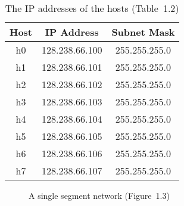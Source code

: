 \documentclass{../UTNetLab}
\begin{document}
\begin{minipage}{0.48\textwidth}
    \begin{flushleft}
        \begin{table}[H]
            \caption{The IP addresses of the hosts (Table~1.2)}
            \label{tab:1.2}
            \centering
            \begin{tabular}{ c c c }
                \hline \hline
                Host & IP Address     & Subnet Mask   \\
                \hline
                h0   & 128.238.66.100 & 255.255.255.0 \\
                h1   & 128.238.66.101 & 255.255.255.0 \\
                h2   & 128.238.66.102 & 255.255.255.0 \\
                h3   & 128.238.66.103 & 255.255.255.0 \\
                h4   & 128.238.66.104 & 255.255.255.0 \\
                h5   & 128.238.66.105 & 255.255.255.0 \\
                h6   & 128.238.66.106 & 255.255.255.0 \\
                h7   & 128.238.66.107 & 255.255.255.0 \\
                \hline \hline
            \end{tabular}
        \end{table}
    \end{flushleft}
\end{minipage}
\begin{minipage}{0.48\textwidth}
    \begin{flushright}
        \begin{figure}[H]
            \centering
            \caption{A single segment network (Figure~1.3)}
            \label{fig:1.3}
        \end{figure}
    \end{flushright}
\end{minipage}
\end{document}
